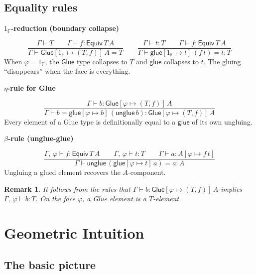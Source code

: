 \documentclass[11pt, a4paper]{article}
\newtheorem{remark}[theorem]{Remark}
\newenvironment{rulebox}[1]{%
  \medskip\noindent\textbf{\textcolor{deepblue}{#1}}\nopagebreak\par\noindent%
  \begin{framed}\small%
}{\end{framed}\medskip}
\newcommand{\pt}[1]{\mathsf{#1}}
\newcommand{\GlueT}{\pt{Glue}}
\newcommand{\glueT}{\pt{glue}}
\newcommand{\unglueT}{\pt{unglue}}
\newcommand{\EquivT}{\pt{Equiv}}
\newcommand{\sys}[2]{[#1 \mapsto #2]}
\newcommand{\topF}{1_{\mathbb{F}}}
\begin{document}
\subsection{Equality rules}

\begin{rulebox}{$\topF$-reduction (boundary collapse)}
\[
\frac{\Gamma \vdash T \qquad \Gamma \vdash f : \EquivT\, T\, A}
     {\Gamma \vdash \GlueT\sys{\topF}{(T,f)}\,A = T}
\qquad
\frac{\Gamma \vdash t : T \qquad \Gamma \vdash f : \EquivT\, T\, A}
     {\Gamma \vdash \glueT\sys{\topF}{t}\,(f\,t) = t : T}
\]
When $\varphi = \topF$, the $\GlueT$ type collapses to $T$ and
$\glueT$ collapses to $t$. The gluing ``disappears'' when the face is
everything.
\end{rulebox}

\begin{rulebox}{$\eta$-rule for Glue}
\[
\frac{\Gamma \vdash b : \GlueT\sys{\varphi}{(T,f)}\,A}
     {\Gamma \vdash b = \glueT\sys{\varphi}{b}\,(\unglueT\, b) :
       \GlueT\sys{\varphi}{(T,f)}\,A}
\]
Every element of a Glue type is definitionally equal to a $\glueT$ of its own
ungluing.
\end{rulebox}

\begin{rulebox}{$\beta$-rule (unglue-glue)}
\[
\frac{\Gamma,\,\varphi \vdash f : \EquivT\, T\, A
\qquad
\Gamma,\,\varphi \vdash t : T
\qquad
\Gamma \vdash a : A\sys{\varphi}{f\,t}}
     {\Gamma \vdash \unglueT\,(\glueT\sys{\varphi}{t}\,a) = a : A}
\]
Ungluing a glued element recovers the $A$-component.
\end{rulebox}

\begin{remark}
  It follows from the rules that
  $\Gamma \vdash b : \GlueT\sys{\varphi}{(T,f)}\,A$ implies
  $\Gamma,\,\varphi \vdash b : T$. On the face $\varphi$, a Glue element
  \emph{is} a $T$-element.
\end{remark}

\section{Geometric Intuition}

\subsection{The basic picture}
\end{document}
